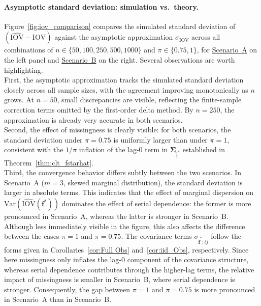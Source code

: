 ﻿\documentclass[12pt,a4paper]{scrreprt}
\theoremstyle{definition}
\begin{document}
\paragraph{Asymptotic standard deviation: simulation vs.\ theory.}
Figure~\ref{fig:iov_comparison} compares the
simulated standard deviation of $\left(\widehat{\mathrm{IOV}} - \mathrm{IOV}\right)$ against
the asymptotic approximation $\sigma_{\mathrm{IOV}}$
across all combinations of $n \in \{50, 100, 250, 500, 1000\}$
and $\pi \in \{0.75, 1\}$, for \hyperref[scen:A]{Scenario~A} on the
left panel and \hyperref[scen:B]{Scenario~B} on the right. 
Several observations are worth highlighting.\\
First, the asymptotic approximation tracks the simulated standard
deviation closely across all sample sizes, with the agreement
improving monotonically as $n$ grows. At $n = 50$, small
discrepancies are visible, reflecting the finite-sample correction
terms omitted by the first-order delta method. By $n = 250$, the
approximation is already very accurate in both scenarios.\\
Second, the effect of missingness is clearly visible: for both
scenarios, the standard deviation under $\pi = 0.75$ is uniformly
larger than under $\pi = 1$, consistent with the $1/\pi$ inflation
of the lag-$0$ term in $\boldsymbol{\Sigma}_{\hat{\boldsymbol{f}}^*}$
established in Theorem~\ref{thm:clt_fstarhat}.\\
Third, the convergence behavior differs subtly between the two
scenarios. In Scenario~A ($m=3$, skewed marginal distribution),
the standard deviation is larger in absolute terms. This indicates
that the effect of marginal dispersion on
$\mathrm{Var}(\widehat{\mathrm{IOV}}(\boldsymbol{f}^*))$
dominates the effect of serial dependence: the former is more pronounced
in Scenario~A, whereas the latter is stronger in Scenario~B.\\
Although less immediately visible in the figure, this also affects the
difference between the cases $\pi = 1$ and $\pi = 0.75$. The covariance
terms \hyperref[thm:clt_fstarhat]{$\sigma_{\hat{\boldsymbol{f}}^*; ij}$} follow the forms given in
Corollaries~\ref{cor:Full Obs} and~\ref{cor:iid_Obs}, respectively.
Since here missingness only inflates the lag-$0$ component of the covariance
structure, whereas serial dependence contributes through the higher-lag
terms, the relative impact of missingness is smaller in Scenario~B,
where serial dependence is stronger. Consequently, the gap between
$\pi = 1$ and $\pi = 0.75$ is more pronounced in Scenario~A than in
Scenario~B.
\end{document}
